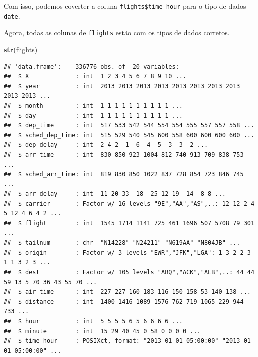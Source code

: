 \documentclass[
]{book}
\newenvironment{Shaded}{\begin{snugshade}}{\end{snugshade}}
\newcommand{\FunctionTok}[1]{\textcolor[rgb]{0.13,0.29,0.53}{\textbf{#1}}}
\newcommand{\NormalTok}[1]{#1}
\newcommand{\OtherTok}[1]{\textcolor[rgb]{0.56,0.35,0.01}{#1}}
\newcommand{\SpecialCharTok}[1]{\textcolor[rgb]{0.81,0.36,0.00}{\textbf{#1}}}
\begin{document}
Com isso, podemos coverter a coluna \texttt{flights\$time\_hour} para o tipo de dados \texttt{date}.

\begin{Shaded}
\end{Shaded}

Agora, todas as colunas de \texttt{flights} estão com os tipos de dados corretos.

\begin{Shaded}
\begin{Highlighting}[]
\FunctionTok{str}\NormalTok{(flights)}
\end{Highlighting}
\end{Shaded}

\begin{verbatim}
## 'data.frame':    336776 obs. of  20 variables:
##  $ X             : int  1 2 3 4 5 6 7 8 9 10 ...
##  $ year          : int  2013 2013 2013 2013 2013 2013 2013 2013 2013 2013 ...
##  $ month         : int  1 1 1 1 1 1 1 1 1 1 ...
##  $ day           : int  1 1 1 1 1 1 1 1 1 1 ...
##  $ dep_time      : int  517 533 542 544 554 554 555 557 557 558 ...
##  $ sched_dep_time: int  515 529 540 545 600 558 600 600 600 600 ...
##  $ dep_delay     : int  2 4 2 -1 -6 -4 -5 -3 -3 -2 ...
##  $ arr_time      : int  830 850 923 1004 812 740 913 709 838 753 ...
##  $ sched_arr_time: int  819 830 850 1022 837 728 854 723 846 745 ...
##  $ arr_delay     : int  11 20 33 -18 -25 12 19 -14 -8 8 ...
##  $ carrier       : Factor w/ 16 levels "9E","AA","AS",..: 12 12 2 4 5 12 4 6 4 2 ...
##  $ flight        : int  1545 1714 1141 725 461 1696 507 5708 79 301 ...
##  $ tailnum       : chr  "N14228" "N24211" "N619AA" "N804JB" ...
##  $ origin        : Factor w/ 3 levels "EWR","JFK","LGA": 1 3 2 2 3 1 1 3 2 3 ...
##  $ dest          : Factor w/ 105 levels "ABQ","ACK","ALB",..: 44 44 59 13 5 70 36 43 55 70 ...
##  $ air_time      : int  227 227 160 183 116 150 158 53 140 138 ...
##  $ distance      : int  1400 1416 1089 1576 762 719 1065 229 944 733 ...
##  $ hour          : int  5 5 5 5 6 5 6 6 6 6 ...
##  $ minute        : int  15 29 40 45 0 58 0 0 0 0 ...
##  $ time_hour     : POSIXct, format: "2013-01-01 05:00:00" "2013-01-01 05:00:00" ...
\end{verbatim}
\end{document}
